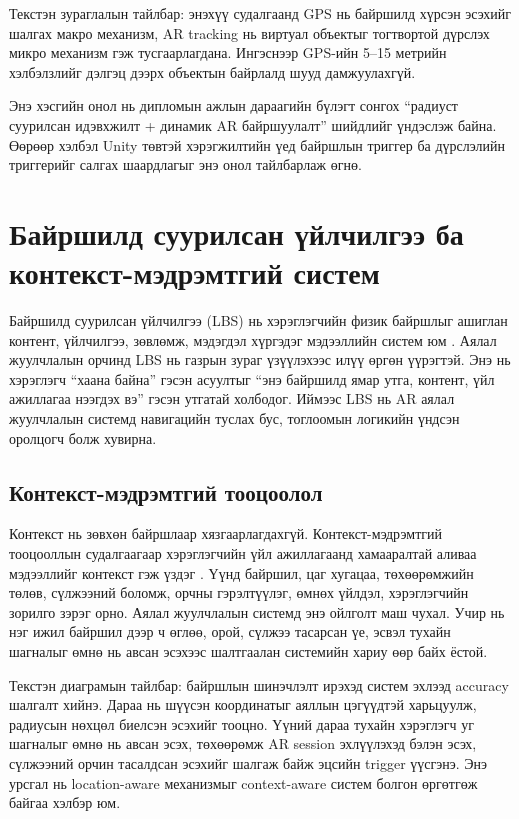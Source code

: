\begin{sloppy}
Текстэн зураглалын тайлбар: энэхүү судалгаанд GPS нь байршилд хүрсэн эсэхийг шалгах макро механизм, AR tracking нь виртуал объектыг тогтвортой дүрслэх микро механизм гэж тусгаарлагдана. Ингэснээр GPS-ийн 5--15 метрийн хэлбэлзлийг дэлгэц дээрх объектын байрлалд шууд дамжуулахгүй.

Энэ хэсгийн онол нь дипломын ажлын дараагийн бүлэгт сонгох ``радиуст суурилсан идэвхжилт + динамик AR байршуулалт'' шийдлийг үндэслэж байна. Өөрөөр хэлбэл Unity төвтэй хэрэгжилтийн үед байршлын триггер ба дүрслэлийн триггерийг салгах шаардлагыг энэ онол тайлбарлаж өгнө.

\section{Байршилд суурилсан үйлчилгээ ба контекст-мэдрэмтгий систем}

Байршилд суурилсан үйлчилгээ (LBS) нь хэрэглэгчийн физик байршлыг ашиглан контент, үйлчилгээ, зөвлөмж, мэдэгдэл хүргэдэг мэдээллийн систем юм \cite{Virrantaus2001}. Аялал жуулчлалын орчинд LBS нь газрын зураг үзүүлэхээс илүү өргөн үүрэгтэй. Энэ нь хэрэглэгч ``хаана байна'' гэсэн асуултыг ``энэ байршилд ямар утга, контент, үйл ажиллагаа нээгдэх вэ'' гэсэн утгатай холбодог. Иймээс LBS нь AR аялал жуулчлалын системд навигацийн туслах бус, тоглоомын логикийн үндсэн оролцогч болж хувирна.

\subsection{Контекст-мэдрэмтгий тооцоолол}

Контекст нь зөвхөн байршлаар хязгаарлагдахгүй. Контекст-мэдрэмтгий тооцооллын судалгаагаар хэрэглэгчийн үйл ажиллагаанд хамааралтай аливаа мэдээллийг контекст гэж үздэг \cite{Schilit1994,Dey2001}. Үүнд байршил, цаг хугацаа, төхөөрөмжийн төлөв, сүлжээний боломж, орчны гэрэлтүүлэг, өмнөх үйлдэл, хэрэглэгчийн зорилго зэрэг орно. Аялал жуулчлалын системд энэ ойлголт маш чухал. Учир нь нэг ижил байршил дээр ч өглөө, орой, сүлжээ тасарсан үе, эсвэл тухайн шагналыг өмнө нь авсан эсэхээс шалтгаалан системийн хариу өөр байх ёстой.

Текстэн диаграмын тайлбар: байршлын шинэчлэлт ирэхэд систем эхлээд accuracy шалгалт хийнэ. Дараа нь шүүсэн координатыг аяллын цэгүүдтэй харьцуулж, радиусын нөхцөл биелсэн эсэхийг тооцно. Үүний дараа тухайн хэрэглэгч уг шагналыг өмнө нь авсан эсэх, төхөөрөмж AR session эхлүүлэхэд бэлэн эсэх, сүлжээний орчин тасалдсан эсэхийг шалгаж байж эцсийн trigger үүсгэнэ. Энэ урсгал нь location-aware механизмыг context-aware систем болгон өргөтгөж байгаа хэлбэр юм.


\end{sloppy}
